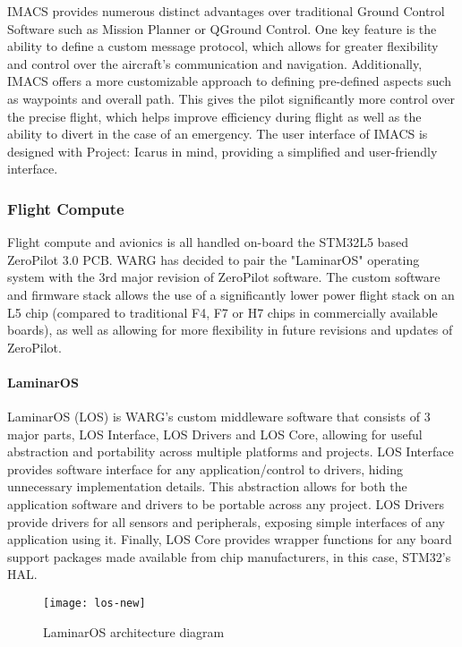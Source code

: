 IMACS provides numerous distinct advantages over traditional Ground Control
Software such as Mission Planner or QGround Control. One key feature is the
ability to define a custom message protocol, which allows for greater
flexibility and control over the aircraft's communication and navigation.
Additionally, IMACS offers a more customizable approach to defining pre-defined
aspects such as waypoints and overall path. This gives the pilot significantly
more control over the precise flight, which helps improve efficiency during
flight as well as the ability to divert in the case of an emergency. The user
interface of IMACS is designed with Project: Icarus in mind, providing a
simplified and user-friendly interface.

\subsubsection{Flight Compute}
\label{sec:flight-compute}

Flight compute and avionics is all handled on-board the STM32L5 based
ZeroPilot 3.0 PCB. WARG has decided to pair the "LaminarOS" operating system
with the 3rd major revision of ZeroPilot software. The custom software and
firmware stack allows the use of a significantly lower power flight stack on an
L5 chip (compared to traditional F4, F7 or H7 chips in commercially available
boards), as well as allowing for more flexibility in future revisions and
updates of ZeroPilot.

\paragraph{LaminarOS}

LaminarOS (LOS) is WARG's custom middleware software that consists of 3 major
parts, LOS Interface, LOS Drivers and LOS Core, allowing for useful abstraction
and portability across multiple platforms and projects. LOS Interface provides
software interface for any application/control to drivers, hiding unnecessary
implementation details. This abstraction allows for both the application
software and drivers to be portable across any project. LOS Drivers provide
drivers for all sensors and peripherals, exposing simple interfaces of any
application using it. Finally, LOS Core provides wrapper functions for any
board support packages made available from chip manufacturers, in this case,
STM32's HAL.

\begin{figure}[H]
        \centering
        \texttt{[image: los-new]}
        \caption{LaminarOS architecture diagram}
\end{figure}

